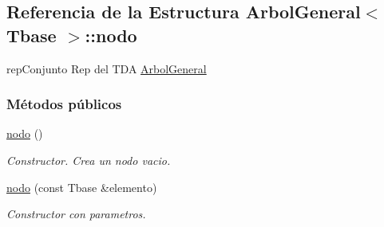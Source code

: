 \hypertarget{structArbolGeneral_1_1nodo}{\subsection{Referencia de la Estructura Arbol\-General$<$ Tbase $>$\-:\-:nodo}
\label{structArbolGeneral_1_1nodo}
}


rep\-Conjunto Rep del T\-D\-A \hyperlink{classArbolGeneral}{Arbol\-General}  


\subsubsection*{Métodos públicos}
\begin{DoxyCompactItemize}
\item 
\hyperlink{structArbolGeneral_1_1nodo_aa217b530d586a4f7908df98083c697ff}{nodo} ()
\begin{DoxyCompactList}\small\item\em Constructor. Crea un nodo vacio. \end{DoxyCompactList}\item 
\hyperlink{structArbolGeneral_1_1nodo_a858436a6f4cf67e88dcea51708871de9}{nodo} (const Tbase \&elemento)
\begin{DoxyCompactList}\small\item\em Constructor con parametros. \end{DoxyCompactList}\end{DoxyCompactItemize}
